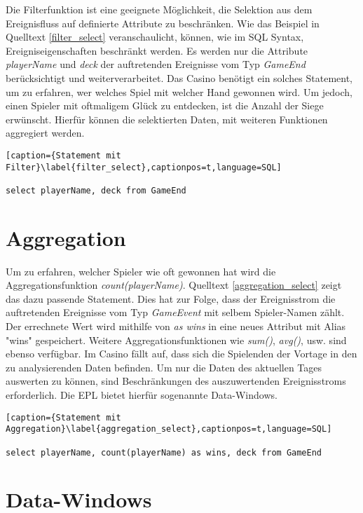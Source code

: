 Die Filterfunktion ist eine geeignete Möglichkeit, die Selektion aus dem Ereignisfluss auf definierte Attribute zu beschränken. Wie das Beispiel in Quelltext \ref{filter_select} veranschaulicht, können, wie im SQL Syntax, Ereigniseigenschaften beschränkt werden.
Es werden nur die Attribute \textit{playerName} und \textit{deck} der auftretenden Ereignisse vom Typ \textit{GameEnd} berücksichtigt und weiterverarbeitet.
Das Casino benötigt ein solches Statement, um zu erfahren, wer welches Spiel mit welcher Hand gewonnen wird. Um jedoch, einen Spieler mit oftmaligem Glück zu entdecken, ist die Anzahl der Siege erwünscht. Hierfür können die selektierten Daten, mit weiteren Funktionen aggregiert werden.

\begin{lstlisting}[caption={Statement mit Filter}\label{filter_select},captionpos=t,language=SQL]

select playerName, deck from GameEnd

\end{lstlisting}

\section{Aggregation}

Um zu erfahren, welcher Spieler wie oft gewonnen hat wird die Aggregationsfunktion \textit{count(playerName)}. Quelltext \ref{aggregation_select} zeigt das dazu passende Statement. Dies hat zur Folge, dass der Ereignisstrom die auftretenden Ereignisse vom Typ \textit{GameEvent} mit selbem Spieler-Namen zählt. Der errechnete Wert wird mithilfe von \textit{as wins} in eine neues Attribut mit Alias "wins" gespeichert. Weitere Aggregationsfunktionen wie \textit{sum()}, \textit{avg()}, usw. sind ebenso verfügbar.
Im Casino fällt auf, dass sich die Spielenden der Vortage in den zu analysierenden Daten befinden. Um nur die Daten des aktuellen Tages auswerten zu können, sind Beschränkungen des auszuwertenden Ereignisstroms erforderlich. Die \acf{EPL} bietet hierfür sogenannte Data-Windows.

\begin{lstlisting}[caption={Statement mit Aggregation}\label{aggregation_select},captionpos=t,language=SQL]

select playerName, count(playerName) as wins, deck from GameEnd

\end{lstlisting}

\section{Data-Windows}
\label{Data-Windows}

